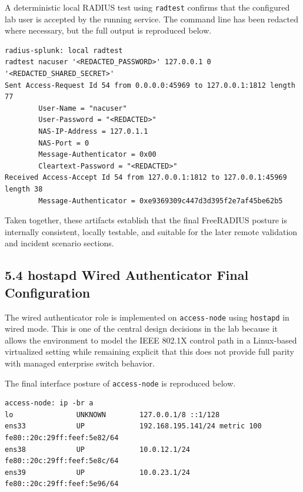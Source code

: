 \documentclass[11pt]{article}
\begin{document}
A deterministic local RADIUS test using \texttt{radtest} confirms that the configured lab user is accepted by the running service. The command line has been redacted where necessary, but the full output is reproduced below.

\begin{verbatim}
radius-splunk: local radtest
radtest nacuser '<REDACTED_PASSWORD>' 127.0.0.1 0 '<REDACTED_SHARED_SECRET>'
Sent Access-Request Id 54 from 0.0.0.0:45969 to 127.0.0.1:1812 length 77
        User-Name = "nacuser"
        User-Password = "<REDACTED>"
        NAS-IP-Address = 127.0.1.1
        NAS-Port = 0
        Message-Authenticator = 0x00
        Cleartext-Password = "<REDACTED>"
Received Access-Accept Id 54 from 127.0.0.1:1812 to 127.0.0.1:45969 length 38
        Message-Authenticator = 0xe9369309c447d3d395f2e7af45be62b5
\end{verbatim}

Taken together, these artifacts establish that the final FreeRADIUS posture is internally consistent, locally testable, and suitable for the later remote validation and incident scenario sections.


\subsection{5.4 hostapd Wired Authenticator Final Configuration}
\label{sec:hostapd-wired-authenticator-final-configuration}

The wired authenticator role is implemented on \texttt{access-node} using \texttt{hostapd} in wired mode. This is one of the central design decisions in the lab because it allows the environment to model the IEEE 802.1X control path in a Linux-based virtualized setting while remaining explicit that this does not provide full parity with managed enterprise switch behavior.

The final interface posture of \texttt{access-node} is reproduced below.

\begin{verbatim}
access-node: ip -br a
lo               UNKNOWN        127.0.0.1/8 ::1/128
ens33            UP             192.168.195.141/24 metric 100 fe80::20c:29ff:feef:5e82/64
ens38            UP             10.0.12.1/24 fe80::20c:29ff:feef:5e8c/64
ens39            UP             10.0.23.1/24 fe80::20c:29ff:feef:5e96/64
\end{verbatim}
\end{document}
